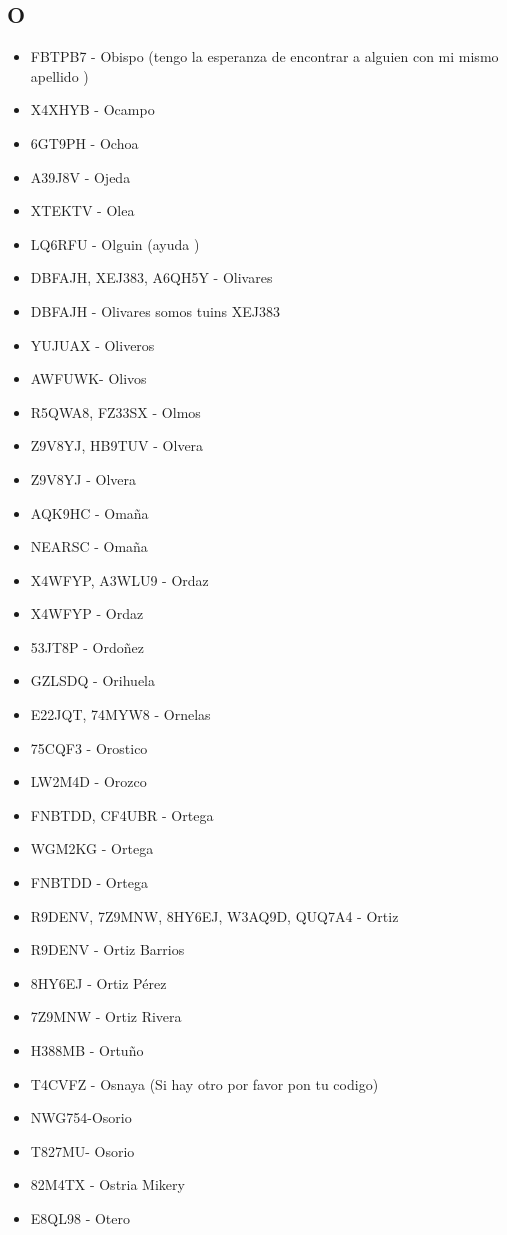 \subsection*{O}
\begin{itemize}[leftmargin=*,nosep]
\item FBTPB7 - Obispo (tengo la esperanza de encontrar a alguien con mi mismo apellido )
\item X4XHYB - Ocampo
\item 6GT9PH  -  Ochoa
\item A39J8V  -  Ojeda
\item XTEKTV - Olea
\item LQ6RFU - Olguin  (ayuda )
\item DBFAJH, XEJ383, A6QH5Y - Olivares
\item DBFAJH  -  Olivares somos tuins XEJ383
\item YUJUAX - Oliveros
\item AWFUWK- Olivos
\item R5QWA8, FZ33SX - Olmos
\item Z9V8YJ, HB9TUV - Olvera
\item Z9V8YJ - Olvera
\item AQK9HC - Omaña
\item NEARSC - Omaña
\item X4WFYP, A3WLU9 - Ordaz
\item X4WFYP  -  Ordaz
\item 53JT8P - Ordoñez
\item GZLSDQ - Orihuela
\item E22JQT, 74MYW8  -  Ornelas
\item 75CQF3 - Orostico
\item LW2M4D - Orozco
\item FNBTDD, CF4UBR - Ortega
\item WGM2KG - Ortega
\item FNBTDD - Ortega
\item R9DENV, 7Z9MNW, 8HY6EJ, W3AQ9D, QUQ7A4 - Ortiz
\item R9DENV - Ortiz Barrios
\item 8HY6EJ  -  Ortiz Pérez
\item 7Z9MNW - Ortiz Rivera
\item H388MB - Ortuño
\item T4CVFZ - Osnaya (Si hay otro por favor pon tu codigo)
\item NWG754-Osorio
\item T827MU- Osorio
\item 82M4TX - Ostria Mikery
\item E8QL98 - Otero
\end{itemize}

